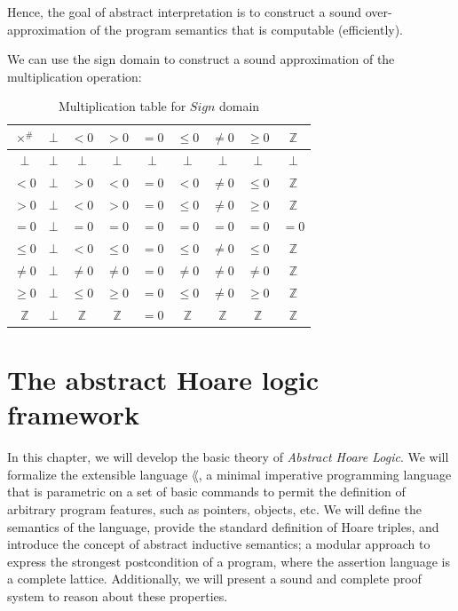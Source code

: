 \documentclass[
  10pt,       %
  twoside,    %
  a4paper,    %
  english,    %
  tikz,       %
  openright,  %
]{book}
\begin{document}
Hence, the goal of abstract interpretation is to construct a sound 
over-approximation of the program semantics that is computable (efficiently).

\begin{example}
  We can use the sign domain to construct a sound approximation of the
  multiplication operation: 
  \begin{table}[h!]
    \centering
    \begin{tabular}{|c|c|c|c|c|c|c|c|c|}
      \hline
      $\times^\#$ & $\bot$ & $< 0$ & $> 0$ & $= 0$ & $\le 0$ & $\ne 0$ & $\ge 0$ 
                  & $\mathbb{Z}$ \\
      \hline
      $\bot$ & $\bot$ & $\bot$ & $\bot$ & $\bot$ & $\bot$ & $\bot$ & $\bot$ 
             & $\bot$ \\
      \hline
      $< 0$ & $\bot$ & $> 0$ & $< 0$ & $= 0$ & $< 0$ & $\ne 0$ & $\le 0$ 
            & $\mathbb{Z}$ \\
      \hline
      $> 0$ & $\bot$ & $< 0$ & $> 0$ & $= 0$ & $\le 0$ & $\ne 0$ & $\ge 0$ 
            & $\mathbb{Z}$ \\
      \hline
      $= 0$ & $\bot$ & $= 0$ & $= 0$ & $= 0$ & $= 0$ & $= 0$ & $= 0$ & $= 0$ \\
      \hline
      $\le 0$ & $\bot$ & $< 0$ & $\le 0$ & $= 0$ & $\le 0$ & $\ne 0$ & $\le 0$ 
              & $\mathbb{Z}$ \\
      \hline
      $\ne 0$ & $\bot$ & $\ne 0$ & $\ne 0$ & $= 0$ & $\ne 0$ & $\ne 0$ 
              & $\ne 0$ & $\mathbb{Z}$ \\
      \hline
      $\ge 0$ & $\bot$ & $\le 0$ & $\ge 0$ & $= 0$ & $\le 0$ & $\ne 0$ 
              & $\ge 0$ & $\mathbb{Z}$ \\
      \hline
      $\mathbb{Z}$ & $\bot$ & $\mathbb{Z}$ & $\mathbb{Z}$ & $= 0$ 
                   & $\mathbb{Z}$ & $\mathbb{Z}$ & $\mathbb{Z}$ & $\mathbb{Z}$ \\
      \hline
    \end{tabular}
    \caption{Multiplication table for $Sign$ domain}
  \end{table}
\end{example}
\chapter{The abstract Hoare logic framework}


In this chapter, we will develop the basic theory of \textit{Abstract Hoare
Logic}. We will formalize the extensible language $\lang$, a minimal imperative
programming language that is parametric on a set of basic commands to permit
the definition of arbitrary program features, such as pointers, objects, etc.
We will define the semantics of the language, provide the standard definition
of Hoare triples, and introduce the concept of abstract inductive semantics; a
modular approach to express the strongest postcondition of a program, where the
assertion language is a complete lattice. Additionally, we will present a sound
and complete proof system to reason about these properties.
\end{document}

